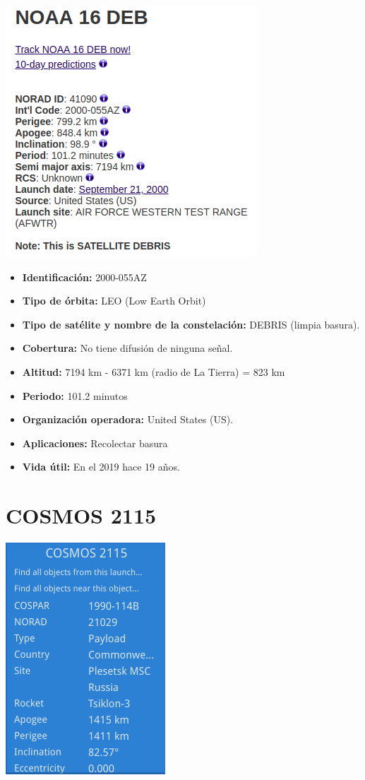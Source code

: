 \documentclass{article}
\begin{document}
\begin{center}
\includegraphics[scale=0.6]{NOAA.png}
\end{center}

\begin{itemize}
\item \textbf{Identificación:} 2000-055AZ
\item \textbf{Tipo de órbita:} LEO (Low Earth Orbit)
\item \textbf{Tipo de satélite y nombre de la constelación:} DEBRIS (limpia basura).
\item \textbf{Cobertura:} No tiene difusión de ninguna señal.
\item \textbf{Altitud:} 7194 km - 6371 km (radio de La Tierra) = 823 km
\item \textbf{Periodo:} 101.2 minutos
\item \textbf{Organización operadora:} United States (US).
\item \textbf{Aplicaciones:} Recolectar basura
\item \textbf{Vida útil:} En el 2019 hace 19 años.
\end{itemize}

\section{COSMOS 2115}

\begin{center}
\includegraphics[scale=0.6]{COSMOS2115.png}
\end{center}
\end{document}
